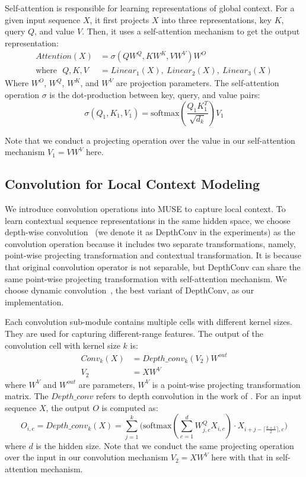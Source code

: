 \documentclass{article} \usepackage{iclr2020_conference,times}
\def\ceil#1{\lceil #1 \rceil}
\begin{document}
Self-attention is responsible for  learning representations of global context.
 For a given input sequence $X$, it first projects $X$ into three representations, key $K$, query $Q$, and value $V$. Then, it uses a self-attention mechanism to get the output representation:
\begin{equation}
\begin{split}
Attention(X) & =  \sigma(QW^Q,KW^K, VW^V)W^O   \\
\text{where}\ \ \ Q, K, V & = Linear_1(X), \ Linear_2(X), \ Linear_3(X) 
\end{split}
\end{equation}
Where $W^O$, $W^Q$, $W^K$, and $W^V$ are projection parameters. The self-attention operation $\sigma$ is the dot-production between key, query, and value pairs:
\begin{equation}
 \sigma(Q_1, K_1, V_1) = \text{softmax}(\frac{Q_1K_1^T}{\sqrt{d_k}})V_1
\end{equation}

Note that we conduct a projecting operation over the value in our self-attention mechanism $V_1=VW^V$ here.

\subsection{Convolution for Local Context Modeling} 
We introduce convolution operations into MUSE to capture local context. To learn contextual sequence representations in the same hidden space, we choose depth-wise convolution~\citep{Chollet_2017} (we denote it as DepthConv in the experiments) as the convolution operation because it includes two separate transformations, namely, point-wise projecting transformation and contextual transformation. It is because that original convolution operator is not separable, but DepthConv can share the same point-wise projecting transformation with  self-attention mechanism. We choose dynamic convolution~\citep{wu2019pay}, the best variant of DepthConv, as our implementation. 

Each convolution sub-module contains multiple cells with different kernel sizes. They are used for capturing different-range features. The output of the convolution cell with kernel size $k$ is:
\begin{equation}
\begin{split}
    Conv_{k}(X) &= Depth\_conv_{k}(V_2)W^{out} \\
     V_2 &= XW^{V}
\end{split}
\end{equation}
where $W^{V}$ and $W^{out}$ are parameters, $W^{V}$ is a point-wise projecting transformation matrix. The $Depth\_conv$ refers to depth convolution in the work of  \citet{wu2019pay}. For an input sequence $X$, the output $O$ is computed as: 
\begin{equation}
    O_{i,c} = Depth\_conv_{k}(X) = \sum\limits_{j=1}^{k} \big( \text{softmax} (\sum\limits_{c=1}^d W_{j,c}^Q X_{i,c})  \cdot X_{i+j-\ceil{\frac{k+1}{2}}, c} \big)
\end{equation}
where $d$ is the hidden size.
Note that we conduct the same projecting operation over the input in our convolution mechanism $V_2=XW^V$ here with that in self-attention mechanism. 
\end{document}
